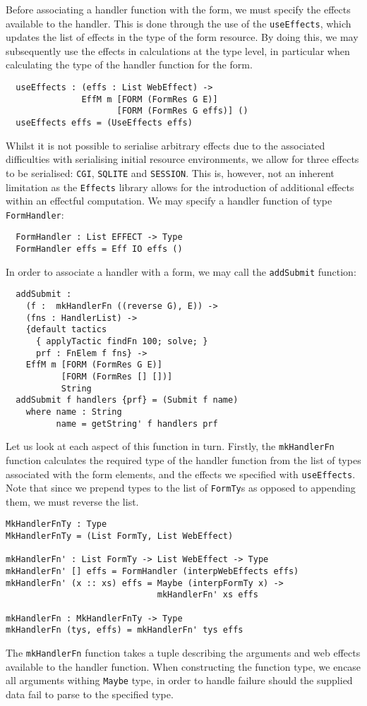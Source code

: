 \documentclass[preprint]{sigplanconf}
\begin{document}
Before associating a handler function with the form, we must specify the effects available to the handler. This is done through the use of the \texttt{useEffects}, which updates the list of effects in the type of the form resource. By doing this, we may subsequently use the effects in calculations at the type level, in particular when calculating the type of the handler function for the form. 
\begin{Verbatim}
  useEffects : (effs : List WebEffect) ->
               EffM m [FORM (FormRes G E)] 
                      [FORM (FormRes G effs)] ()
  useEffects effs = (UseEffects effs)
\end{Verbatim}
Whilst it is not possible to serialise arbitrary effects due to the associated difficulties with serialising initial resource environments, we allow for three effects to be serialised: \texttt{CGI}, \texttt{SQLITE} and \texttt{SESSION}. This is, however, not an inherent limitation as the \texttt{Effects} library allows for the introduction of additional effects within an effectful computation.
%
We may specify a handler function of type \texttt{FormHandler}:
\begin{Verbatim}
  FormHandler : List EFFECT -> Type
  FormHandler effs = Eff IO effs ()
\end{Verbatim}
In order to associate a handler with a form, we may call the \texttt{addSubmit} function:
\begin{Verbatim}
  addSubmit : 
    (f :  mkHandlerFn ((reverse G), E)) ->
    (fns : HandlerList) ->
    {default tactics 
      { applyTactic findFn 100; solve; }
      prf : FnElem f fns} ->
    EffM m [FORM (FormRes G E)]
           [FORM (FormRes [] [])] 
           String
  addSubmit f handlers {prf} = (Submit f name)
    where name : String
          name = getString' f handlers prf          
\end{Verbatim}

Let us look at each aspect of this function in turn. Firstly, the \texttt{mkHandlerFn} function calculates the required type of the handler function from the list of types associated with the form elements, and the effects we specified with \texttt{useEffects}. Note that since we prepend types to the list of \texttt{FormTy}s as opposed to appending them, we must reverse the list.
\begin{Verbatim}
MkHandlerFnTy : Type
MkHandlerFnTy = (List FormTy, List WebEffect)

mkHandlerFn' : List FormTy -> List WebEffect -> Type
mkHandlerFn' [] effs = FormHandler (interpWebEffects effs) 
mkHandlerFn' (x :: xs) effs = Maybe (interpFormTy x) -> 
                              mkHandlerFn' xs effs 

mkHandlerFn : MkHandlerFnTy -> Type 
mkHandlerFn (tys, effs) = mkHandlerFn' tys effs 
\end{Verbatim}
The \texttt{mkHandlerFn} function takes a tuple describing the arguments and web effects available to the handler function. When constructing the function type, we encase all arguments withing \texttt{Maybe} type, in order to handle failure should the supplied data fail to parse to the specified type.
\end{document}

